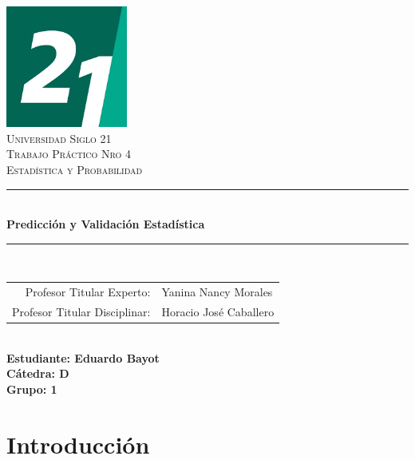 \documentclass[a4paper,12pt]{article}
\begin{document}
\begin{titlepage}
    \begin{center}
        \includegraphics[width=0.3\textwidth]{logo.png}\\[1cm]
        \textsc{\LARGE Universidad Siglo 21}\\[1.5cm]
        \textsc{\Large Trabajo Práctico Nro 4}\\[0.5cm]
        \textsc{\large Estadística y Probabilidad}\\[2cm]

        \rule{\linewidth}{0.5mm} \\[0.4cm]
        {\huge \bfseries Predicción y Validación Estadística }\\[0.4cm]
        \rule{\linewidth}{0.5mm} \\[1.5cm]

        \begin{tabular}{rl}
            \small Profesor Titular Experto: & \small Yanina Nancy Morales \\
            \small Profesor Titular Disciplinar: & \small Horacio José Caballero \\
        \end{tabular}
        \\[1.5cm]

        \textbf{\small Estudiante: Eduardo Bayot}\\
        \textbf{\small Cátedra: D}\\
        \textbf{\small Grupo: 1}
    \end{center}
\end{titlepage}



\date{}
\author{}

\tableofcontents

\section{Introducción}
\end{document}
